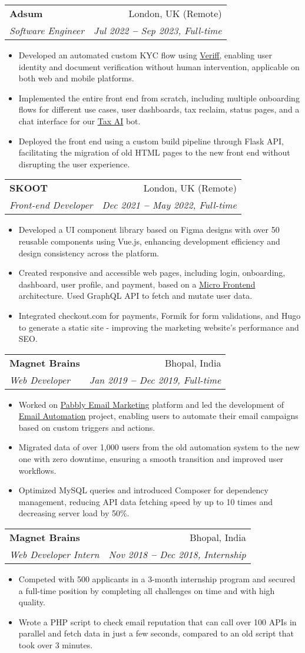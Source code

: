 \documentclass[letterpaper,12pt]{article}
\makeatletter
\newcommand{\resumeItem}[1]{
  \item\small{
    {#1 \vspace{-2pt}}
  }
}
\newcommand{\resumeSubheading}[4]{
  \vspace{-2pt}\item
    \begin{tabular*}{0.97\textwidth}[t]{l@{\extracolsep{\fill}}r}
      \textbf{#1} & #2 \\
      \textit{\small#3} & \textit{\small #4} \\
    \end{tabular*}\vspace{-7pt}
}
\newcommand{\resumeItemListStart}{\begin{itemize}}
\newcommand{\resumeItemListEnd}{\end{itemize}\vspace{-5pt}}
\def\myHometown{Bhopal, India}
\makeatother
\begin{document}
\resumeSubheading
{Adsum}{London, UK (Remote)}
{Software Engineer}{Jul 2022 \textbf{--} Sep 2023, Full-time}
\resumeItemListStart
\resumeItem{Developed an automated custom KYC flow using \href{https://veriff.com}{\color{blue}Veriff}, enabling user identity and document verification without human intervention, applicable on both web and mobile platforms.}
\resumeItem{Implemented the entire front end from scratch, including multiple onboarding flows for different use cases, user dashboards, tax reclaim, status pages, and a chat interface for our \href{https://chat.taxai.uk}{\color{blue}Tax AI} bot.}
\resumeItem{Deployed the front end using a custom build pipeline through Flask API, facilitating the migration of old HTML pages to the new front end without disrupting the user experience.}
\resumeItemListEnd

\resumeSubheading
{SKOOT}{London, UK (Remote)}
{Front-end Developer}{Dec 2021 \textbf{--} May 2022, Full-time}
\resumeItemListStart
\resumeItem{Developed a UI component library based on Figma designs with over 50 reusable components using Vue.js, enhancing development efficiency and design consistency across the platform.}
\resumeItem{Created responsive and accessible web pages, including login, onboarding, dashboard, user profile, and payment, based on a \href{https://chat.taxai.uk}{\color{blue}Micro Frontend} architecture. Used GraphQL API to fetch and mutate user data.}
\resumeItem{Integrated checkout.com for payments, Formik for form validations, and Hugo to generate a static site - improving the marketing website's performance and SEO.}
\resumeItemListEnd

\resumeSubheading
{Magnet Brains}{\myHometown}
{Web Developer}{Jan 2019 \textbf{--} Dec 2019, Full-time}
\resumeItemListStart
\resumeItem{Worked on \href{https://www.pabbly.com/email-marketing}{\color{blue}Pabbly Email Marketing} platform and led the development of \href{https://youtube.com/watch?v=kkopsVYOO7Y}{\color{blue}Email Automation} project, enabling users to automate their email campaigns based on custom triggers and actions.}
\resumeItem{Migrated data of over 1,000 users from the old automation system to the new one with zero downtime, ensuring a smooth transition and improved user workflows.}
\resumeItem{Optimized MySQL queries and introduced Composer for dependency management, reducing API data fetching speed by up to 10 times and decreasing server load by 50\%.}
\resumeItemListEnd

\resumeSubheading
{Magnet Brains}{\myHometown}
{Web Developer Intern}{Nov 2018 \textbf{--} Dec 2018, Internship}
\resumeItemListStart
\resumeItem{Competed with 500 applicants in a 3-month internship program and secured a full-time position by completing all challenges on time and with high quality.}
\resumeItem{Wrote a PHP script to check email reputation that can call over 100 APIs in parallel and fetch data in just a few seconds, compared to an old script that took over 3 minutes.}
\resumeItemListEnd
\end{document}
